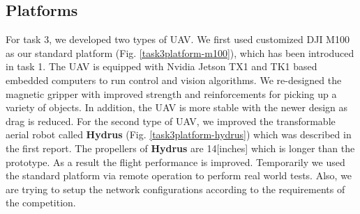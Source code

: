 \documentclass{standalone}
\begin{document}
\subsection{Platforms}

For task 3, we developed two types of UAV. We first used customized
DJI M100 as our standard platform (Fig. \ref{task3platform-m100}), which has
been introduced in task 1. The UAV is equipped with Nvidia Jetson TX1
and TK1 based embedded computers to run control and vision
algorithms. 
We re-designed the magnetic gripper with improved strength and
reinforcements for picking up a variety of objects. In addition, the UAV is
more stable with the newer design as drag is reduced.
For the second type of UAV, we improved the transformable aerial robot called
{\bf Hydrus} (Fig. \ref{task3platform-hydrus}) which was described in the first
report. The propellers of {\bf Hydrus} are 14[inches] which is longer
than the prototype. As a result the flight performance is
improved. Temporarily we used the standard platform via remote operation to
perform real world tests. Also, we are trying to setup the network
configurations according to the requirements of the competition. 

\end{document}
